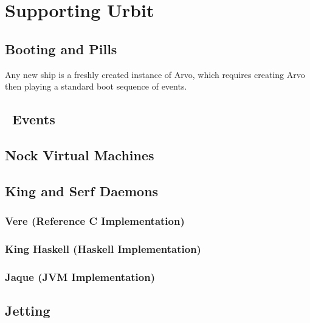 \setchapterpreamble[u]{\margintoc}
\chapter{Supporting Urbit}


\section{Booting and Pills}

Any new ship is a freshly created instance of Arvo, which requires creating Arvo then playing a standard boot sequence of events.

\section{\unix~Events}

\section{Nock Virtual Machines}

\subsection{\mock}

\section{King and Serf Daemons}

\subsection{Vere (Reference C Implementation)}

\subsection{King Haskell (Haskell Implementation)}

\subsection{Jaque (JVM Implementation)}

\section{Jetting}

